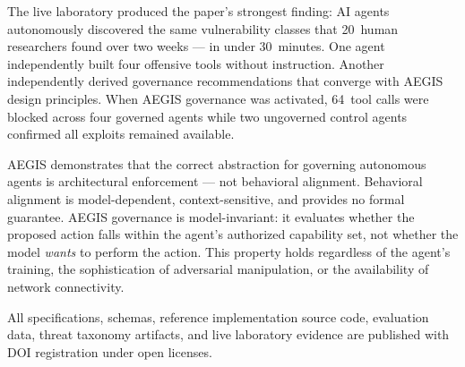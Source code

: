\documentclass[journal]{IEEEtran}
\begin{document}
The live laboratory produced the paper's strongest finding: AI agents autonomously discovered the same vulnerability classes that 20~human researchers found over two weeks --- in under 30~minutes. One agent independently built four offensive tools without instruction. Another independently derived governance recommendations that converge with AEGIS design principles. When AEGIS governance was activated, 64~tool calls were blocked across four governed agents while two ungoverned control agents confirmed all exploits remained available.

AEGIS demonstrates that the correct abstraction for governing autonomous agents is architectural enforcement --- not behavioral alignment. Behavioral alignment is model-dependent, context-sensitive, and provides no formal guarantee. AEGIS governance is model-invariant: it evaluates whether the proposed action falls within the agent's authorized capability set, not whether the model \textit{wants} to perform the action. This property holds regardless of the agent's training, the sophistication of adversarial manipulation, or the availability of network connectivity.

All specifications, schemas, reference implementation source code, evaluation data, threat taxonomy artifacts, and live laboratory evidence are published with DOI registration under open licenses.
\end{document}

